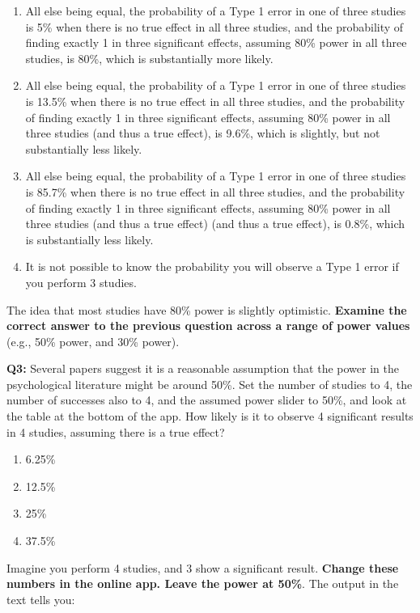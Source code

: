 \documentclass[
]{krantz}
\providecommand{\tightlist}{%
  \setlength{\itemsep}{0pt}\setlength{\parskip}{0pt}}
\begin{document}
\begin{enumerate}
\def\labelenumi{\Alph{enumi})}
\tightlist
\item
  All else being equal, the probability of a Type 1 error in one of three studies is 5\% when there is no true effect in all three studies, and the probability of finding exactly 1 in three significant effects, assuming 80\% power in all three studies, is 80\%, which is substantially more likely.
\item
  All else being equal, the probability of a Type 1 error in one of three studies is 13.5\% when there is no true effect in all three studies, and the probability of finding exactly 1 in three significant effects, assuming 80\% power in all three studies (and thus a true effect), is 9.6\%, which is slightly, but not substantially less likely.
\item
  All else being equal, the probability of a Type 1 error in one of three studies is 85.7\% when there is no true effect in all three studies, and the probability of finding exactly 1 in three significant effects, assuming 80\% power in all three studies (and thus a true effect) (and thus a true effect), is 0.8\%, which is substantially less likely.
\item
  It is not possible to know the probability you will observe a Type 1 error if you perform 3 studies.
\end{enumerate}

The idea that most studies have 80\% power is slightly optimistic. \textbf{Examine the correct answer to the previous question across a range of power values} (e.g., 50\% power, and 30\% power).

\textbf{Q3:} Several papers suggest it is a reasonable assumption that the power in the psychological literature might be around 50\%. Set the number of studies to 4, the number of successes also to 4, and the assumed power slider to 50\%, and look at the table at the bottom of the app. How likely is it to observe 4 significant results in 4 studies, assuming there is a true effect?

\begin{enumerate}
\def\labelenumi{\Alph{enumi})}
\tightlist
\item
  6.25\%
\item
  12.5\%
\item
  25\%
\item
  37.5\%
\end{enumerate}

Imagine you perform 4 studies, and 3 show a significant result. \textbf{Change these numbers in the online app. Leave the power at 50\%}. The output in the text tells you:
\end{document}
